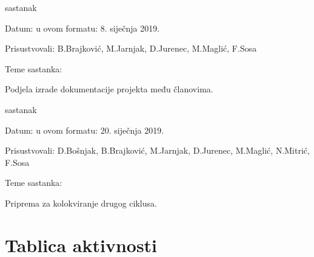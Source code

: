 \begin{packed_enum}
			\item  sastanak
			\item[] \begin{packed_item}
				\item Datum: u ovom formatu: 8. siječnja 2019.
				\item Prisustvovali: B.Brajković, M.Jarnjak, D.Jurenec, M.Maglić, F.Sosa
				\item Teme sastanka:
				\begin{packed_item}
					\item  Podjela izrade dokumentacije projekta među članovima.
				\end{packed_item}
			\end{packed_item}
		
			\item  sastanak
			\item[] \begin{packed_item}
				\item Datum: u ovom formatu: 20. siječnja 2019.
				\item Prisustvovali: D.Bošnjak, B.Brajković, M.Jarnjak, D.Jurenec, M.Maglić, N.Mitrić, F.Sosa
				\item Teme sastanka:
				\begin{packed_item}
					\item  Priprema za kolokviranje drugog ciklusa.
				\end{packed_item}
			\end{packed_item}
			
			
		\end{packed_enum}
		
		\eject
		\section*{Tablica aktivnosti}
		
